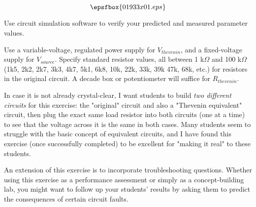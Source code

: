 

$$\epsfbox{01933x01.eps}$$

\vfil \eject






Use circuit simulation software to verify your predicted and measured parameter values.







Use a variable-voltage, regulated power supply for $V_{thevenin}$, and a fixed-voltage supply for $V_{source}$.  Specify standard resistor values, all between 1 k$\Omega$ and 100 k$\Omega$ (1k5, 2k2, 2k7, 3k3, 4k7, 5k1, 6k8, 10k, 22k, 33k, 39k 47k, 68k, etc.) for resistors in the original circuit.  A decade box or potentiometer will suffice for $R_{thevenin}$.

In case it is not already crystal-clear, I want students to build {\it two different circuits} for this exercise: the "original" circuit and also a "Thevenin equivalent" circuit, then plug the exact same load resistor into both circuits (one at a time) to see that the voltage across it is the same in both cases.  Many students seem to struggle with the basic concept of equivalent circuits, and I have found this exercise (once successfully completed) to be excellent for "making it real" to these students.

An extension of this exercise is to incorporate troubleshooting questions.  Whether using this exercise as a performance assessment or simply as a concept-building lab, you might want to follow up your students' results by asking them to predict the consequences of certain circuit faults.




